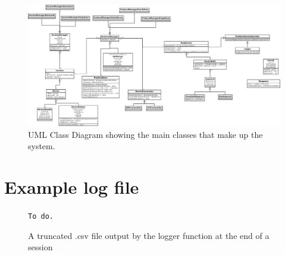 \begin{figure}
\centering
\includegraphics[angle = 90, scale=0.17]{UMLClassDiagram}
\caption{UML Class Diagram showing the main classes that make up the system.}
\label{fig:uml}
\end{figure}

\chapter{Example log file}

\begin{figure}
{\tt To do.}
\caption{A truncated .csv file output by the logger function at the end of a session}
\label{csv}
\end{figure}


